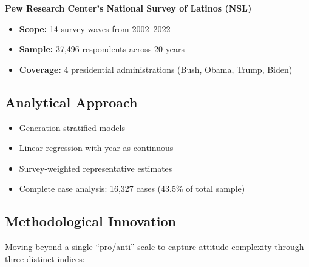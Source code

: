 \documentclass[11pt,letterpaper]{article}
\newcommand{\compactdesc}[2]{\item \textbf{#1:} #2}
\begin{document}
\textbf{Pew Research Center's National Survey of Latinos (NSL)}
\begin{itemize}
    \compactdesc{Scope}{14 survey waves from 2002--2022}
    \compactdesc{Sample}{37,496 respondents across 20 years}
    \compactdesc{Coverage}{4 presidential administrations (Bush, Obama, Trump, Biden)}
\end{itemize}

\subsection{Analytical Approach}
\begin{itemize}
    \item Generation-stratified models
    \item Linear regression with year as continuous
    \item Survey-weighted representative estimates
    \item Complete case analysis: 16,327 cases (43.5\% of total sample)
\end{itemize}

\subsection{Methodological Innovation}

Moving beyond a single ``pro/anti'' scale to capture attitude complexity through three distinct indices:
\end{document}
